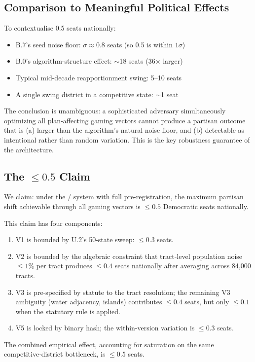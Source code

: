 \subsection{Comparison to Meaningful Political Effects}

To contextualise 0.5 seats nationally:
\begin{itemize}
\item B.7's seed noise floor: $\sigma \approx 0.8$ seats (so 0.5 is within $1\sigma$)
\item B.0's algorithm-structure effect: $\sim$18 seats (36$\times$ larger)
\item Typical mid-decade reapportionment swing: 5--10 seats
\item A single swing district in a competitive state: $\sim$1 seat
\end{itemize}

The conclusion is unambiguous: a sophisticated adversary simultaneously
optimizing all plan-affecting gaming vectors cannot produce a partisan
outcome that is (a) larger than the algorithm's natural noise floor, and
(b) detectable as intentional rather than random variation.
This is the key robustness guarantee of the \bisect{} architecture.

\subsection{The $\leq 0.5$ Claim}

We claim: under the \bisect{}/\dia{} system with full pre-registration,
the maximum partisan shift achievable through all gaming vectors is
$\leq 0.5$ Democratic seats nationally.

This claim has four components:
\begin{enumerate}
\item V1 is bounded by U.2's 50-state sweep: $\leq 0.3$ seats.
\item V2 is bounded by the algebraic constraint that tract-level
  population noise $\leq 1\%$ per tract produces $\leq 0.4$ seats
  nationally after averaging across 84,000 tracts.
\item V3 is pre-specified by statute to the tract resolution; the
  remaining V3 ambiguity (water adjacency, islands) contributes
  $\leq 0.4$ seats, but only $\leq 0.1$ when the statutory rule is
  applied.
\item V5 is locked by binary hash; the within-version variation is
  $\leq 0.3$ seats.
\end{enumerate}
The combined empirical effect, accounting for saturation on the same
competitive-district bottleneck, is $\leq 0.5$ seats.

